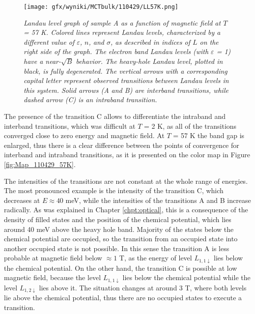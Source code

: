 \documentclass[titlepage,a4paper]{book}
\begin{document}
\begin{figure}[ht]
	\centering
	\texttt{[image: gfx/wyniki/MCTbulk/110429/LL57K.png]}
	\vspace{-10pt}
	\caption{\textit{Landau level graph of sample A as a function of magnetic field at $T$ = 57 K. Colored lines represent Landau levels, characterized by a different value of $\varepsilon$, $n$, and $\sigma$, as described in indices of $L$ on the right side of the graph. The electron band Landau levels (with $\varepsilon$ = 1) have a near-$\sqrt{B}$ behavior. The heavy-hole Landau level, plotted in black, is fully degenerated. The vertical arrows with a corresponding capital letter represent observed transitions between Landau levels in this system. Solid arrows (A and B) are interband transitions, while dashed arrow (C) is an intraband transition.}} 
	\label{fig:LL_110429_57K}
\end{figure}

The presence of the transition C allows to differentiate the intraband and interband transitions, which was difficult at $T$ = 2 K, as all of the transitions converged close to zero energy and magnetic field. At $T$ = 57 K the band gap is enlarged, thus there is a clear difference between the points of convergence for interband and intraband transitions, as it is presented on the color map in Figure \ref{fig:Map_110429_57K}.
 
The intensities of the transitions are not constant at the whole range of energies. The most pronounced example is the intensity of the transition C, which decreases at $E \approx 40$ meV, while the intensities of the transitions A and B increase radically. As was explained in Chapter \ref{chpt:optical}, this is a consequence of the density of filled states and the position of the chemical potential, which lies around 40 meV above the heavy hole band. Majority of the states below the chemical potential are occupied, so the transition from an occupied state into another occupied state is not possible. In this sense the transition A is less probable at magnetic field below $\approx 1$ T, as the energy of level $L_{1,1\downarrow}$ lies below the chemical potential. On the other hand, the transition C is possible at low magnetic field, because the level $L_{1,1\downarrow}$ lies below the chemical potential while the level $L_{1,2\downarrow}$ lies above it. The situation changes at around 3 T, where both levels lie above the chemical potential, thus there are no occupied states to execute a transition. 
 
\end{document}
